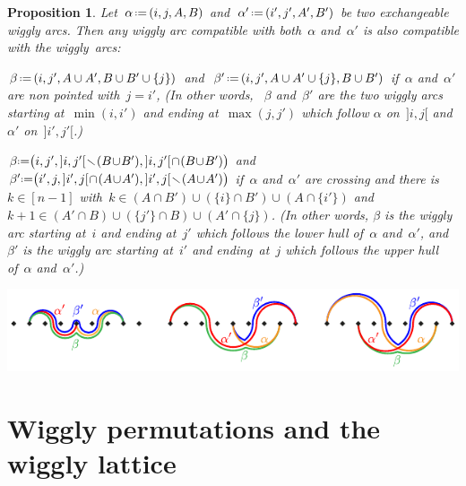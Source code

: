 \documentclass[submission]{FPSAC2025}
\newtheorem{proposition}[theorem]{Proposition}
\theoremstyle{definition}
\newcommand{\ssm}{\smallsetminus} %
\newcommand{\eqdef}{\mbox{\,\raisebox{0.2ex}{\scriptsize\ensuremath{\mathrm:}}\ensuremath{=}\,}} %
\begin{document}
\begin{proposition}
\label{prop:uerp}
Let~$\alpha \eqdef (i, j, A, B)$ and~$\alpha' \eqdef (i', j', A', B')$ be two exchangeable wiggly arcs.
Then any wiggly arc compatible with both~$\alpha$ and~$\alpha'$ is also compatible with the wiggly~arcs:
\begin{compactitem}
\item $\beta \eqdef (i, j', A \cup A', B \cup B' \cup \{j\})$ and~$\beta' \eqdef (i, j', A \cup A' \cup \{j\}, B \cup B')$ if~$\alpha$ and~$\alpha'$ are non pointed with~$j = i'$,
(In other words, ~$\beta$ and~$\beta'$ are the two wiggly arcs starting at~$\min(i,i')$ and ending at~$\max(j,j')$ which follow $\alpha$ on~$]i,j[$ and~$\alpha'$ on~$]i',j'[$.)
\item $\beta \!\eqdef\! \big( i, j', {]i,j'[} \!\ssm\! (B \!\cup\! B'), {]i,j'[} \!\cap\! (B \!\cup\! B') \big)$ and~$\beta' \!\eqdef\! \big( i', j, {]i',j[} \!\cap\! (A \!\cup\! A'), {]i',j[} \!\ssm\! (A \!\cup\! A') \big)$ if~$\alpha$ and~$\alpha'$ are crossing and there is~$k \in [n-1]$ with~$k \in (A \cap B') \cup (\{i\} \cap B') \cup (A \cap \{i'\})$ and~$k+1 \in (A' \cap B) \cup (\{j'\} \cap B) \cup (A' \cap \{j\})$.
(In other words, $\beta$ is the wiggly arc starting at~$i$ and ending at~$j'$ which follows the lower hull of~$\alpha$ and~$\alpha'$, and~$\beta'$ is the wiggly arc starting at~$i'$ and ending~at~$j$ which follows the upper hull of~$\alpha$ and~$\alpha'$.)
\end{compactitem}
%

\centerline{\includegraphics[scale=1.3]{incompatible3}}
\vspace{-.4cm}
\end{proposition}

\section{Wiggly permutations and the wiggly lattice}
\label{sec:wigglyPermutations}
\end{document}
